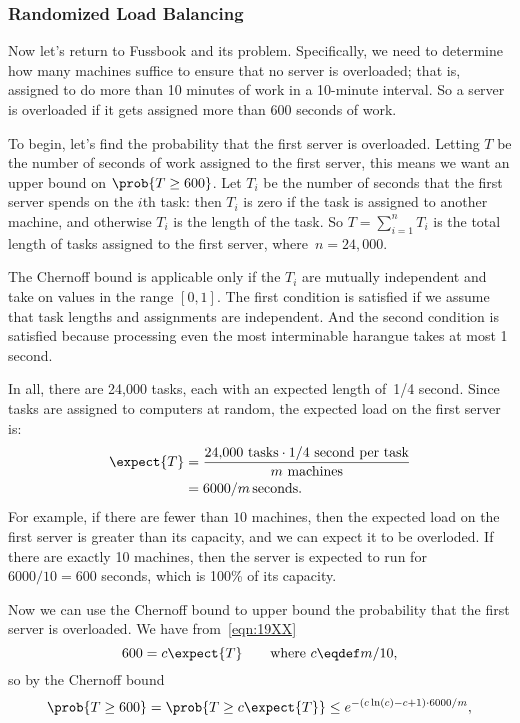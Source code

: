\subsubsection{Randomized Load Balancing}

Now let's return to Fussbook and its  problem.
Specifically, we need to determine how many machines suffice to ensure
that no server is overloaded; that is, assigned to do more than 10
minutes of work in a 10-minute interval.  So a server is overloaded if
it gets assigned more than 600 seconds of work.

To begin, let's find the probability that the first server is
overloaded.  Letting $T$ be the number of seconds of work assigned to
the first server, this means we want an upper bound on $\prob{T \geq
  600}$.  Let $T_i$ be the number of seconds that the first server
spends on the $i$th task: then $T_i$ is zero if the task is assigned
to another machine, and otherwise $T_i$ is the length of the task.  So
$T = \sum_{i = 1}^n T_i$ is the total length of tasks assigned to the
first server, where~$n = 24{,}000$.

The Chernoff bound is applicable only if the $T_i$ are mutually
independent and take on values in the range $[0, 1]$.  The first
condition is satisfied if we assume that task lengths and assignments
are independent.  And the second condition is satisfied because
processing even the most interminable harangue takes at most 1 second.

In all, there are 24,000 tasks, each with an expected length of~1/4
second.  Since tasks are assigned to computers at random, the expected
load on the first server is:
\begin{align}
\expect{T} & = \frac{24{,}000 \mbox{ tasks} \cdot 1/4 \mbox{ second per task}}
  {m \mbox{ machines}} \notag\\
  & = 6000 / m\,\text{seconds}.
\label{eqn:19XX}
\end{align}
For example, if there are fewer than $10$ machines, then the expected
load on the first server is greater than its capacity, and we can
expect it to be overloded.  If there are exactly 10 machines, then the
server is expected to run for $6000/10 = 600$ seconds, which is 100\%
of its capacity.

Now we can use the Chernoff bound to upper bound the probability that
the first server is overloaded.  We have from~\eqref{eqn:19XX}
\[
600 = c \expect{T}  \qquad \text{where } c \eqdef m/10,
\]
so by the Chernoff bound
\begin{align*}
\prob{T \geq 600} = \prob{T \geq c \expect{T}} \leq e^{-(c \ln(c) - c + 1) \cdot 6000 / m},
\end{align*}

